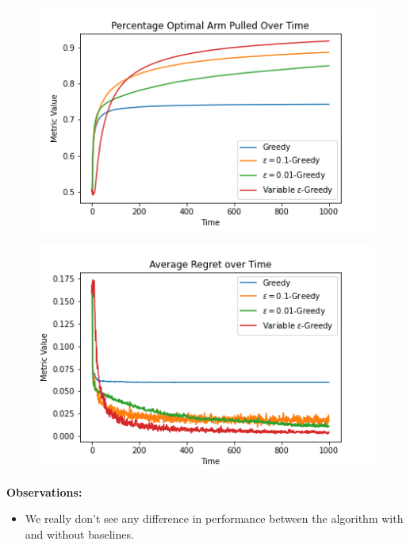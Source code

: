 \documentclass{article}
\begin{document}
		\begin{figure}[H]
		\graphicspath{ {../Experiments/Bernoulli_2_Reinforce/} }
		\centering
		\begin{minipage}{.5\textwidth}
		  \centering
		  \includegraphics[width=\linewidth]{Percentage_Optimal_Arm_Pulled_Over_Time.png}
		  \label{fig:test1}
		\end{minipage}%
		\begin{minipage}{.5\textwidth}
		  \centering
		  \includegraphics[width=\linewidth]{Average_Regret_over_Time.png}
		  \label{fig:test2}
		\end{minipage}
		\end{figure}
		
		\textbf{Observations:}
		\begin{itemize}
			\item We really don't see any difference in performance between the algorithm with and without baselines.
		\end{itemize}
		
\end{document}
